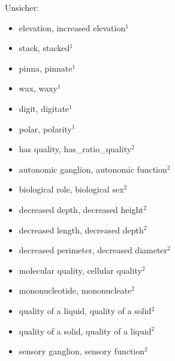 Unsicher:
\begin{itemize}
  \item elevation, increased elevation$^1$
  \item stack, stacked$^1$
  \item pinna, pinnate$^1$
  \item wax, waxy$^1$
  \item digit, digitate$^1$
  \item polar, polarity$^1$
  \item has quality, has_ratio_quality$^2$
  \item autonomic ganglion, autonomic function$^2$
  \item biological role, biological sex$^2$
  \item decreased depth, decreased height$^2$
  \item decreased length, decreased depth$^2$
  \item decreased perimeter, decreased diameter$^2$
  \item molecular quality, cellular quality$^2$
  \item mononucleotide, mononucleate$^2$
  \item quality of a liquid, quality of a solid$^2$
  \item quality of a solid, quality of a liquid$^2$
  \item sensory ganglion, sensory function$^2$
\end{itemize}

